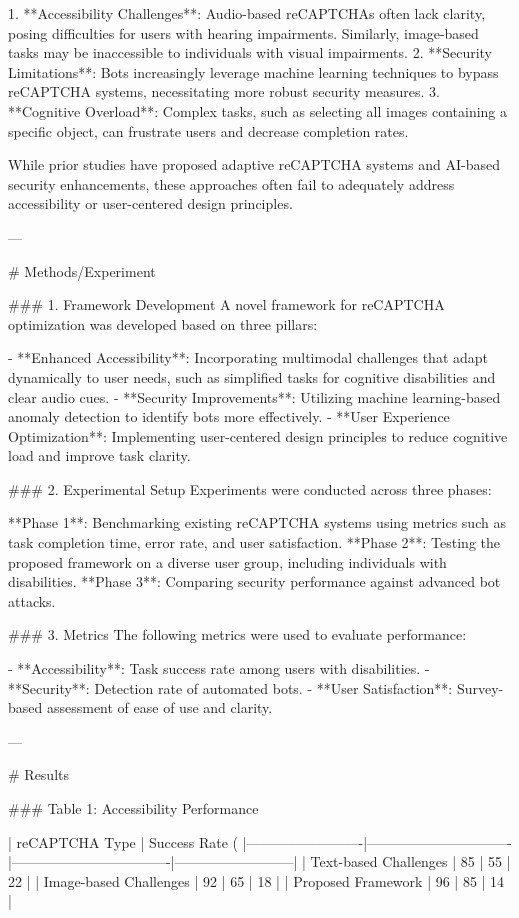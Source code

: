 1. **Accessibility Challenges**: Audio-based reCAPTCHAs often lack clarity, posing difficulties for users with hearing impairments. Similarly, image-based tasks may be inaccessible to individuals with visual impairments.  
2. **Security Limitations**: Bots increasingly leverage machine learning techniques to bypass reCAPTCHA systems, necessitating more robust security measures.  
3. **Cognitive Overload**: Complex tasks, such as selecting all images containing a specific object, can frustrate users and decrease completion rates.  

While prior studies have proposed adaptive reCAPTCHA systems and AI-based security enhancements, these approaches often fail to adequately address accessibility or user-centered design principles.

---

# Methods/Experiment  

### 1. Framework Development  
A novel framework for reCAPTCHA optimization was developed based on three pillars:  

- **Enhanced Accessibility**: Incorporating multimodal challenges that adapt dynamically to user needs, such as simplified tasks for cognitive disabilities and clear audio cues.  
- **Security Improvements**: Utilizing machine learning-based anomaly detection to identify bots more effectively.  
- **User Experience Optimization**: Implementing user-centered design principles to reduce cognitive load and improve task clarity.  

### 2. Experimental Setup  
Experiments were conducted across three phases:  

**Phase 1**: Benchmarking existing reCAPTCHA systems using metrics such as task completion time, error rate, and user satisfaction.  
**Phase 2**: Testing the proposed framework on a diverse user group, including individuals with disabilities.  
**Phase 3**: Comparing security performance against advanced bot attacks.

### 3. Metrics  
The following metrics were used to evaluate performance:  

- **Accessibility**: Task success rate among users with disabilities.  
- **Security**: Detection rate of automated bots.  
- **User Satisfaction**: Survey-based assessment of ease of use and clarity.

---

# Results  

### Table 1: Accessibility Performance  

| reCAPTCHA Type         | Success Rate (%
|-------------------------|-------------------------------|----------------------------------|--------------------------|
| Text-based Challenges  | 85                            | 55                               | 22                       |
| Image-based Challenges | 92                            | 65                               | 18                       |
| Proposed Framework     | 96                            | 85                               | 14                       |

